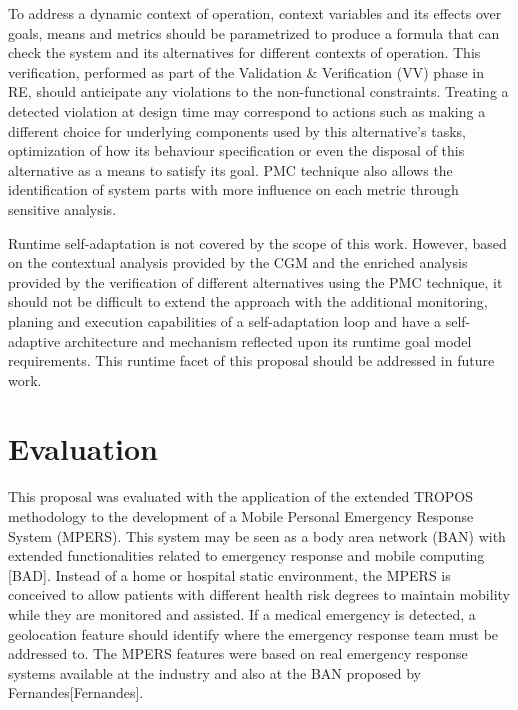 To address a dynamic context of operation, context variables and its effects over goals, means and metrics should be parametrized to produce a formula that can check the system and its alternatives for different contexts of operation. This verification, performed as part of the Validation \& Verification (VV) phase in RE, should anticipate any violations to the non-functional constraints. Treating a detected violation at design time may correspond to actions such as making a different choice for underlying components used by this alternative's tasks, optimization of how its behaviour specification or even the disposal of this alternative as a means to satisfy its goal. PMC technique also allows the identification of system parts with more influence on each metric through sensitive analysis.

Runtime self-adaptation is not covered by the scope of this work. However, based on the contextual analysis provided by the CGM and the enriched analysis provided by the verification of different alternatives using the PMC technique, it should not be difficult to extend the approach with the additional monitoring, planing and execution capabilities of a self-adaptation loop and have a self-adaptive architecture and mechanism reflected upon its runtime goal model requirements. This runtime facet of this proposal should be addressed in future work.




\section{Evaluation}

This proposal was evaluated with the application of the extended TROPOS methodology to the development of a Mobile Personal Emergency Response System (MPERS). This system may be seen as a body area network (BAN) with extended functionalities related to emergency response and mobile computing [BAD]. Instead of a home or hospital static environment, the MPERS is conceived to allow patients with different health risk degrees to maintain mobility while they are monitored and assisted. If a medical emergency is detected, a geolocation feature should identify where the emergency response team must be addressed to. The MPERS features were based on real emergency response systems available at the industry and also at the BAN proposed by Fernandes[Fernandes].

